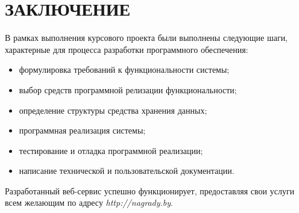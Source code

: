 \section*{ЗАКЛЮЧЕНИЕ}

В рамках выполнения курсового проекта были выполнены
следующие шаги, характерные для процесса разработки 
программного обеспечения:

\begin{itemize}
\item формулировка требований к функциональности системы;
\item выбор средств программной релизации функциональности;
\item определение структуры средства хранения данных;
\item программная реализация системы;
\item тестирование и отладка программной реализации;
\item написание технической и пользовательской документации.
\end{itemize}

Разработанный веб-сервис успешно функционирует, предоставляя
свои услуги всем желающим по адресу \textit{http://nagrady.by}.
